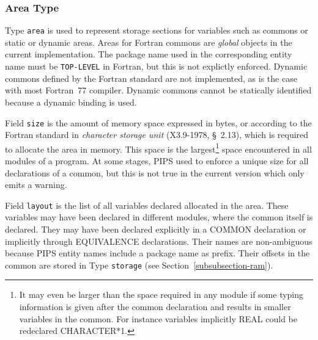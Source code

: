 \documentclass[a4paper]{article}
\begin{document}
\subsubsection{Area Type}
\label{subsubsection-area}


Type \texttt{area} is used to represent storage sections for variables
such as commons or static or dynamic areas. Areas for Fortran commons
are \emph{global} objects in the current implementation. The package
name used in the corresponding entity name must be \verb/TOP-LEVEL/ in
Fortran, but this is not explictly enforced. Dynamic commons defined
by the Fortran standard are not implemented, as is the case with most
Fortran~77 compiler. Dynamic commons cannot be statically identified
because a dynamic binding is used.

\begin{comment}
Le domaine \texttt{area} est utilis� pour repr�senter les aires de
stockage des variables telles que les commons et les aires statiques ou
dynamiques. Les commons Fortran sont des objets globaux et leur package de
rattachement est donc \verb/TOP-LEVEL/. Les autres aires sont locales 
\end{comment}

Field \texttt{size} is the amount of memory space expressed in bytes, or
according to the Fortran standard in \emph{character storage unit}
(X3.9-1978, \S~2.13), which is required to allocate the area in memory.
This space is the largest\footnote{It may even be larger than the space
  required in any module if some typing information is given after the
  common declaration and results in smaller variables in the common. For
  instance variables implicitly REAL could be redeclared CHARACTER*1.}
space encountered in all modules of a program. At some stages, PIPS used
to enforce a unique size for all declarations of a common, but this is not
true in the current version which only emits a warning.

\begin{comment}
Le sous-domaine \texttt{size} donne la taille de l'aire
exprim�e en octets (\emph{character storage unit} de la norme ANSI
X3.9-1978, \S~2.13). Cette taille est la taille maximum rencontr�e
parmi les modules d'un programme. 
\end{comment}

Field \texttt{layout} is the list of all variables declared allocated in the
area. These variables may have been declared in different modules, where
the common itself is declared. They may have been declared explicitly in a
COMMON declaration or implicitly through EQUIVALENCE declarations. Their
names are non-ambiguous because PIPS entity names include a package name
as prefix. Their offsets in the common are stored in Type \texttt{storage}
(see Section~\ref{subsubsection-ram}).
\end{document}
